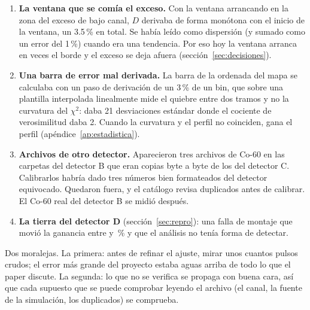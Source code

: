 \documentclass[11pt,a4paper]{article}
\begin{document}
\begin{enumerate}
      Co-60 a menos de dos anchos de resolución uno del otro, el recocido
      encontró que el óptimo global del modelo de seis parámetros es no
      físico: usa una de las componentes como fondo ancho, invierte las
      resoluciones de los dos bordes o apaga uno de ellos, cuando el Co-60
      emite las dos líneas casi igual. El ajuste local parecía sano sólo
      porque la semilla lo mantenía en la zona física. La solución fue
      restringir el modelo con física: la plantilla simulada fija de una vez
      la separación y las intensidades.
\item \textbf{La ventana que se comía el exceso.} Con la ventana arrancando en
      la zona del exceso de bajo canal, $D$ derivaba de forma monótona con el
      inicio de la ventana, un 3.5\,\% en total. Se había leído como
      dispersión (y sumado como un error del 1\,\%) cuando era una tendencia.
      Por eso hoy la ventana arranca en \InicioRel{} veces el borde y el
      exceso se deja afuera (sección~\ref{sec:decisiones}).
\item \textbf{Una barra de error mal derivada.} La barra de la ordenada del
      mapa se calculaba con un paso de derivación de un 3\,\% de un bin, que
      sobre una plantilla interpolada linealmente mide el quiebre entre dos
      tramos y no la curvatura del $\chi^2$: daba 21 desviaciones estándar
      donde el cociente de verosimilitud daba 2. Cuando la curvatura y el
      perfil no coinciden, gana el perfil (apéndice~\ref{ap:estadistica}).
\item \textbf{Archivos de otro detector.} Aparecieron tres archivos de Co-60
      en las carpetas del detector B que eran copias byte a byte de los del
      detector C. Calibrarlos habría dado tres números bien formateados del
      detector equivocado. Quedaron fuera, y el catálogo revisa duplicados
      antes de calibrar. El Co-60 real del detector B se midió después.
\item \textbf{La tierra del detector D} (sección~\ref{sec:repro}): una falla
      de montaje que movió la ganancia entre \RepMin{} y \RepMax\,\% y que el análisis no
      tenía forma de detectar.
\end{enumerate}

\noindent
Dos moralejas. La primera: antes de refinar el ajuste, mirar unos cuantos
pulsos crudos; el error más grande del proyecto estaba aguas arriba de todo
lo que el paper discute. La segunda: lo que no se verifica se propaga con
buena cara, así que cada supuesto que se puede comprobar leyendo el archivo
(el canal, la fuente de la simulación, los duplicados) se comprueba.
\end{document}
